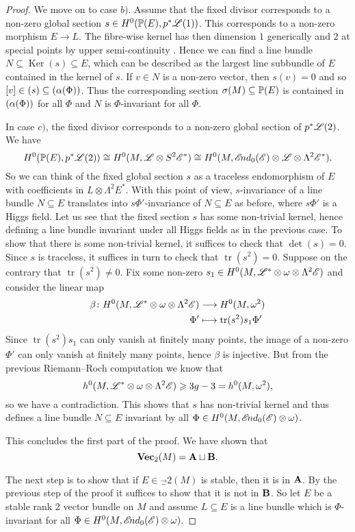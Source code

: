 \documentclass[A4paper, 12pt, british, reqno]{amsart}
\let\div\relax
\DeclareMathOperator{\div}{div}
\DeclareMathOperator{\Ker}{Ker}
\newcommand{\ot}{\otimes}
\newcommand{\dual}{^{*}}
\begin{document}
\begin{prop}
\begin{proof}
	We move on to case $b)$.
	Assume that the fixed divisor corresponds to a non-zero global section $s\in H^{0}(\P(E),p^{*}\L(1))$.
	This corresponds to a non-zero morphism $E\to L$.
	The fibre-wise kernel has then dimension $1$ generically and $2$ at special points by upper semi-continuity \cite[Proposition 1.3.2]{ati89}.
	Hence we can find a line bundle $N\subseteq \Ker(s)\subseteq E$, which can be described as the largest line subbundle of $E$ contained in the kernel of $s$.
	If $v\in N$ is a non-zero vector, then $s(v)=0$ and so $[v]\in \div(s)\subseteq \div(\alpha(\Phi))$.
	Thus the corresponding section $\sigma(M)\subseteq \P(E)$ is contained in $\div(\alpha(\Phi))$ for all $\Phi$ and $N$ is $\Phi$-invariant for all $\Phi$.

	In case $c)$, the fixed divisor corresponds to a non-zero global section of $p^{*}\L(2)$.
	We have
	\[ H^{0}(\P(E),p^{*}\L(2))\cong H^{0}(M,\L\ot S^{2}\E\dual)\cong H^{0}(M,\sEnd_{0}(\E)\ot \L\ot \Lambda^{2}\E\dual). \]
	So we can think of the fixed global section $s$ as a traceless endomorphism of $E$ with coefficients in $L\ot \Lambda^{2}E\dual$.
	With this point of view, $s$-invariance of a line bundle $N\subseteq E$ translates into $s\Phi'$-invariance of $N\subseteq E$ as before, where $s\Phi'$ is a Higgs field.
	Let us see that the fixed section $s$ has some non-trivial kernel, hence defining a line bundle invariant under all Higgs fields as in the previous case.
	To show that there is some non-trivial kernel, it suffices to check that $\det(s)=0$.
	Since $s$ is traceless, it suffices in turn to check that $\operatorname{tr}(s^{2})=0$.
	Suppose on the contrary that $\operatorname{tr}(s^{2})\neq 0$.
	Fix some non-zero $s_{1}\in H^{0}(M,\L\dual\ot \w\ot \Lambda^{2}\E)$ and consider the linear map
	\begin{align*}
	    \beta\colon H^{0}(M,\L\dual\ot\w\ot \Lambda^{2}\E) & \longrightarrow H^{0}(M,\w^{2}) \\
	    \Phi' & \longmapsto \operatorname{tr}(s^{2})s_{1}\Phi'
	\end{align*}
	Since $\operatorname{tr}(s^{2})s_{1}$ can only vanish at finitely many points, the image of a non-zero $\Phi'$ can only vanish at finitely many points, hence $\beta$ is injective.
	But from the previous Riemann--Roch computation we know that
	\[ h^{0}(M,\L\dual\ot\w\ot \Lambda^{2}\E)\geqslant 3g-3=h^{0}(M,\w^{2}), \]
	so we have a contradiction.
	This shows that $s$ has non-trivial kernel and thus defines a line bundle $N\subseteq E$ invariant by all $\Phi\in H^{0}(M,\sEnd_{0}(\E)\ot \w)$.

	This concludes the first part of the proof.
	We have shown that
	\[ \Vec_{2}(M)=\bfA\sqcup \bfB. \]

	The next step is to show that if $E\in \Vec_{2}(M)$ is stable, then it is in $\bfA$.
	By the previous step of the proof it suffices to show that it is not in $\bfB$.
	So let $E$ be a stable rank $2$ vector bundle on $M$ and assume $L\subseteq E$ is a line bundle which is $\Phi$-invariant for all $\Phi\in H^{0}(M,\sEnd_{0}(\E)\ot \w)$.
    \end{proof}
\end{prop}



\vspace{0.3cm}
\end{document}
